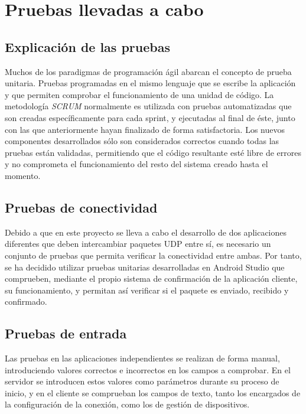 \documentclass[12pt]{article}
\begin{document}
\section{Pruebas llevadas a cabo} \label{sec:pru}
    \subsection{Explicación de las pruebas}
    Muchos de los paradigmas de programación ágil abarcan el concepto de prueba unitaria. Pruebas programadas en el mismo lenguaje que se escribe la aplicación y que permiten comprobar el funcionamiento de una unidad de código. La metodología \textit{SCRUM} normalmente es utilizada con pruebas automatizadas que son creadas específicamente para cada sprint, y ejecutadas al final de éste, junto con las que anteriormente hayan finalizado de forma satisfactoria. Los nuevos componentes desarrollados sólo son considerados correctos cuando todas las pruebas están validadas, permitiendo que el código resultante esté libre de errores y no comprometa el funcionamiento del resto del sistema creado hasta el momento.

    \subsection{Pruebas de conectividad}
    Debido a que en este proyecto se lleva a cabo el desarrollo de dos aplicaciones diferentes que deben intercambiar paquetes UDP entre sí, es necesario un conjunto de pruebas que permita verificar la conectividad entre ambas. Por tanto, se ha decidido utilizar pruebas unitarias desarrolladas en Android Studio que comprueben, mediante el propio sistema de confirmación de la aplicación cliente, su funcionamiento, y permitan así verificar si el paquete es enviado, recibido y confirmado.

    \subsection{Pruebas de entrada}
    Las pruebas en las aplicaciones independientes se realizan de forma manual, introduciendo valores correctos e incorrectos en los campos a comprobar. En el servidor se introducen estos valores como parámetros durante su proceso de inicio, y en el cliente se comprueban los campos de texto, tanto los encargados de la configuración de la conexión, como los de gestión de dispositivos.
\end{document}
